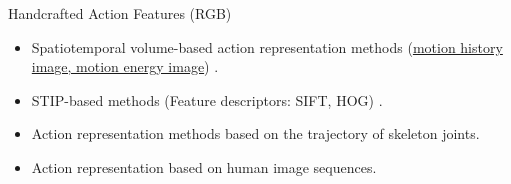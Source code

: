 \begin{frame}{Handcrafted Action Features (RGB)}
    \begin{itemize}
        \item<1-> Spatiotemporal volume-based action representation methods (\href{https://web.cse.ohio-state.edu/~davis.1719/CVL/Research/MHI/mhi.html}{motion history image, motion energy image}) \cite{li2011human}.
        \item<2-> STIP-based methods (Feature descriptors: SIFT, HOG) \cite{nguyen2014stap} \cite{dalal2005histograms}.
        \item<3-> Action representation methods based on the trajectory of skeleton joints.
        \item<4-> Action representation based on human image sequences.
    \end{itemize}
\end{frame}


